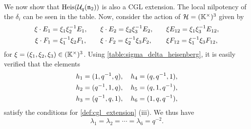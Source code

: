 \begin{example}
	We now show that $\operatorname{Heis}(\mathcal{U}_q(\mathfrak{n}_2))$ is also a CGL extension. The local nilpotency
	of the $\delta_i$ can be seen in the table. Now, consider the action of $\mathcal{H} =
		(\mathbb{K}^\times)^3$ given by
	\begin{align*}
		\xi \cdot E_1 & = \xi_1\xi_2^{-1} E_1, \quad &  & \xi \cdot E_2 = \xi_2\xi_3^{-1} E_2, \quad &  & \xi E_{12} = \xi_1 \xi_3^{-1} E_{12}, \\
		\xi \cdot F_1 & = \xi_1^{-1}\xi_2F_1, \quad  &  & \xi \cdot F_2 = \xi_2^{-1}\xi_3 F_2, \quad  &  & \xi F_{12} = \xi_1^{-1} \xi_3 F_{12},
	\end{align*}
	for $\xi = (\xi_1, \xi_2, \xi_3) \in (\mathbb{K}^\times)^3$. Using
	\cref{table:sigma_delta_heisenberg}, it is easily verified that the elements
	\begin{align*}
		h_1 & = (1, q^{-1}, q), \quad h_4 = (q, q^{-1}, 1), \\
		h_2 & = (q^{-1},1, q), \quad h_5 = (q,1, q^{-1}),   \\
		h_3 & = (q^{-1}, q, 1), \quad h_6 = (1, q, q^{-1}),
	\end{align*}
	satisfy the conditions for \cref{def:cgl_extension} (iii). We thus have
	\begin{equation}\label{eq:heisenberg_lambda_k}
		\lambda_1 = \lambda_2 = \cdots = \lambda_6 = q^{-2}.
	\end{equation}
\end{example}

